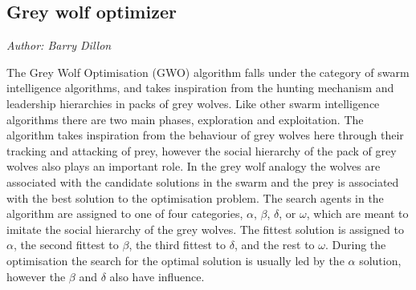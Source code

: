\documentclass[11pt]{article}
\begin{document}
\subsection{Grey wolf optimizer}
\emph{Author: Barry Dillon}

\noindent The Grey Wolf Optimisation (GWO) algorithm \cite{gworef} falls under the category of swarm intelligence algorithms, and takes inspiration from the hunting mechanism and leadership hierarchies in packs of grey wolves.  Like other swarm intelligence algorithms there are two main phases, exploration and exploitation.  The algorithm takes inspiration from the behaviour of grey wolves here through their tracking and attacking of prey, however the social hierarchy of the pack of grey wolves also plays an important role.  In the grey wolf analogy the wolves are associated with the candidate solutions in the swarm and the prey is associated with the best solution to the optimisation problem.  The search agents in the algorithm are assigned to one of four categories, $\alpha$, $\beta$, $\delta$, or $\omega$, which are meant to imitate the social hierarchy of the grey wolves.  The fittest solution is assigned to $\alpha$, the second fittest to $\beta$, the third fittest to $\delta$, and the rest to $\omega$.  During the optimisation the search for the optimal solution is usually led by the $\alpha$ solution, however the $\beta$ and $\delta$ also have influence.
\end{document}

